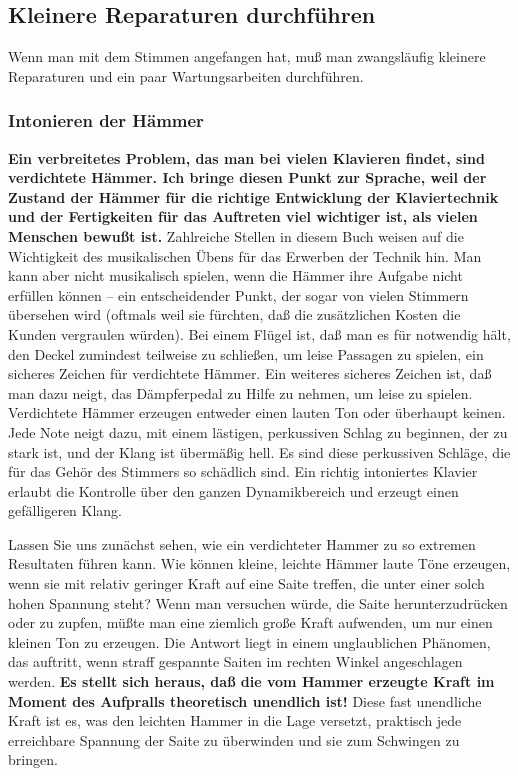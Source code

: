 
\subsection{Kleinere Reparaturen durchführen}
\label{c2_7}

Wenn man mit dem Stimmen angefangen hat, muß man zwangsläufig kleinere Reparaturen und ein paar Wartungsarbeiten durchführen.
 

\label{c2_7a}
\subsubsection{Intonieren der Hämmer}
\label{c2_7_hamm}

\textbf{Ein verbreitetes Problem, das man bei vielen Klavieren findet, sind verdichtete Hämmer.
Ich bringe diesen Punkt zur Sprache, weil der Zustand der Hämmer für die richtige Entwicklung der Klaviertechnik und der Fertigkeiten für das Auftreten viel wichtiger ist, als vielen Menschen bewußt ist.}
Zahlreiche Stellen in diesem Buch weisen auf die Wichtigkeit des musikalischen Übens für das Erwerben der Technik hin.
Man kann aber nicht musikalisch spielen, wenn die Hämmer ihre Aufgabe nicht erfüllen können -- ein entscheidender Punkt, der sogar von vielen Stimmern übersehen wird (oftmals weil sie fürchten, daß die zusätzlichen Kosten die Kunden vergraulen würden).
Bei einem Flügel ist, daß man es für notwendig hält, den Deckel zumindest teilweise zu schließen, um leise Passagen zu spielen, ein sicheres Zeichen für verdichtete Hämmer.
Ein weiteres sicheres Zeichen ist, daß man dazu neigt, das Dämpferpedal zu Hilfe zu nehmen, um leise zu spielen.
Verdichtete Hämmer erzeugen entweder einen lauten Ton oder überhaupt keinen.
Jede Note neigt dazu, mit einem lästigen, perkussiven Schlag zu beginnen, der zu stark ist, und der Klang ist übermäßig hell.
Es sind diese perkussiven Schläge, die für das Gehör des Stimmers so schädlich sind.
Ein richtig intoniertes Klavier erlaubt die Kontrolle über den ganzen Dynamikbereich und erzeugt einen gefälligeren Klang.

Lassen Sie uns zunächst sehen, wie ein verdichteter Hammer zu so extremen Resultaten führen kann.
Wie können kleine, leichte Hämmer laute Töne erzeugen, wenn sie mit relativ geringer Kraft auf eine Saite treffen, die unter einer solch hohen Spannung steht?
Wenn man versuchen würde, die Saite herunterzudrücken oder zu zupfen, müßte man eine ziemlich große Kraft aufwenden, um nur einen kleinen Ton zu erzeugen.
Die Antwort liegt in einem unglaublichen Phänomen, das auftritt, wenn straff gespannte Saiten im rechten Winkel angeschlagen werden.
\textbf{Es stellt sich heraus, daß die vom Hammer erzeugte Kraft im Moment des Aufpralls theoretisch unendlich ist!}
Diese fast unendliche Kraft ist es, was den leichten Hammer in die Lage versetzt, praktisch jede erreichbare Spannung der Saite zu überwinden und sie zum Schwingen zu bringen.

